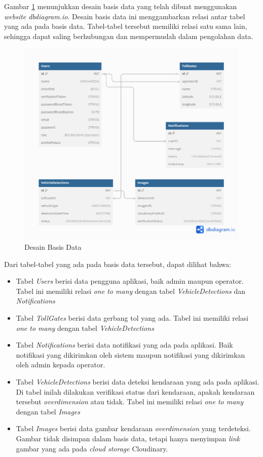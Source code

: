 Gambar \ref{fig:databasedesign} menunjukkan desain basis data yang telah dibuat menggunakan \emph{website} \emph{dbdiagram.io}. Desain basis data ini menggambarkan relasi antar tabel yang ada pada basis data. Tabel-tabel tersebut memiliki relasi satu sama lain, sehingga dapat saling berhubungan dan mempermudah dalam pengolahan data.
\begin{figure}[htbp]
  \centering

  \includegraphics[scale=0.5]{gambar/bab3-desain-database.png}

  \caption{Desain Basis Data}
  \label{fig:databasedesign}
\end{figure}
Dari tabel-tabel yang ada pada basis data tersebut, dapat dilihat bahwa:

\begin{itemize}[nolistsep]
  \item Tabel \emph{Users} berisi data pengguna aplikasi, baik admin maupun operator. Tabel ini memiliki relasi \emph{one to many} dengan tabel \emph{VehicleDetections} dan \emph{Notifications}
  \item Tabel \emph{TollGates} berisi data gerbang tol yang ada. Tabel ini memiliki relasi \emph{one to many} dengan tabel \emph{VehicleDetections}
  \item Tabel \emph{Notifications} berisi data notifikasi yang ada pada aplikasi. Baik notifikasi yang dikirimkan oleh sistem maupun notifikasi yang dikirimkan oleh admin kepada operator.
  \item Tabel \emph{VehicleDetections} berisi data deteksi kendaraan yang ada pada aplikasi. Di tabel inilah dilakukan verifikasi status dari kendaraan, apakah kendaraan tersebut \emph{overdimension} atau tidak. Tabel ini memiliki relasi \emph{one to many} dengan tabel \emph{Images}
  \item Tabel \emph{Images} berisi data gambar kendaraan \emph{overdimension} yang terdeteksi. Gambar tidak disimpan dalam basis data, tetapi hanya menyimpan \emph{link} gambar yang ada pada \emph{cloud storage} Cloudinary.
\end{itemize}

